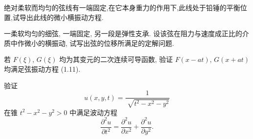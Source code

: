 

\begin{exercise}
  绝对柔软而均匀的弦线有一端固定,在它本身重力的作用下,此线处于铅锤的平衡位置,试导出此线的微小横振动方程.
\end{exercise}



\begin{exercise}
  一柔软均匀的细弦, 一端固定, 另一段是弹性支承.
  设该弦在阻力与速度成正比的介质中作微小的横振动, 试写出弦的位移所满足的定解问题.
\end{exercise}



\begin{exercise}
  若 $F(\xi)$, $G(\xi)$ 均为其变元的二次连续可导函数,
  验证 $F(x-at)$, $G(x+at)$ 均满足弦振动方程 (1.11).
\end{exercise}



\begin{exercise}
  验证
  \[u(x,y,t) = \frac{1}{\sqrt[]{t^2-x^2-y^2}}\]
  在锥 $t^2-x^2-y^2>0$ 中满足波动方程
  \[\frac{\partial^2 u}{\partial t^2}
    = \frac{\partial^2 u}{\partial x^2}
      + \frac{\partial^2 u}{\partial y^2}.\]
\end{exercise}

